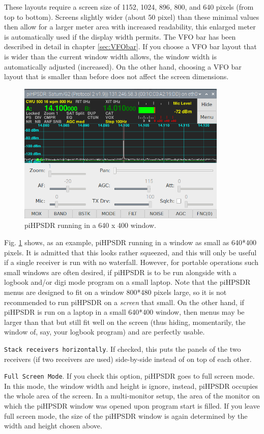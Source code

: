 \documentclass[12pt]{book}
\def\rett#1{\texttt{\color{red}#1}}
\def\pH{pi\-HPSDR }
\begin{document}
These layouts require a screen size of 1152, 1024, 896, 800, and 640 pixels (from top to
bottom). Screens slightly wider (about 50 pixel) than these minimal values then allow for a larger meter
area with increased readability, this enlarged meter is automatically used if the display
width permits.
The VFO bar has been described in detail in chapter
\ref{sec:VFObar}. If you choose a VFO bar layout that is wider than the current
window width allows, the window width is automatically adjusted (increased). On the
other hand, choosing a VFO bar layout that is smaller than before does not affect
the screen dimensions.

\begin{figure}[ht!]
\center
\includegraphics[width=10cm]{640x400.png}
\caption{\pH running in a 640 x 400 window.}
\label{fig:640x400}
\end{figure}

Fig. \ref{fig:640x400} shows, as an example, \pH running in a window as small
as 640*400 pixels. It is admitted that this looks rather squeezed, and this
will only be useful if a single receiver is run with no waterfall. However, for
portable operations such small windows are often desired,
if \pH is to be run alongside with a logbook and/or digi mode program on a small laptop.
Note that the \pH menus are designed to fit on a window 800*480 pixels large, so
it is not recommended to run \pH on a \textit{screen} that small. On the other hand,
if \pH is run on a laptop in a small 640*400 window, then menus may be larger than
that but still fit well on the screen (thus hiding, momentarily, the window of,
say, your logbook program) and are perfectly usable.

\rett{Stack receivers horizontally}. If checked, this puts the panels
of the two receivers (if two receivers are used) side-by-side instead of on top
of each other.

\rett{Full Screen Mode}. If you check this option, \pH goes to full screen mode.
In this mode, the window width and height is ignore, instead, \pH occupies
the whole area of the screen. In a multi-monitor setup, the area of the monitor
on which the \pH window was opened upon program start is filled.
If you leave full screen mode, the size of the \pH window is again
determined by the width and height chosen above.
\end{document}
